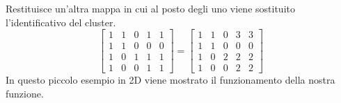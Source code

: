 \documentclass{beamer}
\begin{document}
\begin{frame}
Restituisce un'altra mappa in cui al posto degli uno viene sostituito l'identificativo del cluster.
\[
\begin{bmatrix}
    1       & 1 & 0 & 1 & 1\\
    1       & 1 & 0 & 0 & 0 \\
    1       & 0 & 1 & 1 & 1 \\
    1       & 0 & 0 & 1 & 1
\end{bmatrix}
=
\begin{bmatrix}
    1       & 1 & 0 & 3 & 3\\
    1       & 1 & 0 & 0 & 0 \\
    1       & 0 & 2 & 2 & 2 \\
    1       & 0 & 0 & 2 & 2
\end{bmatrix}
\]
In questo piccolo esempio in 2D viene mostrato il funzionamento della nostra funzione.
\end{frame}
\end{document}
